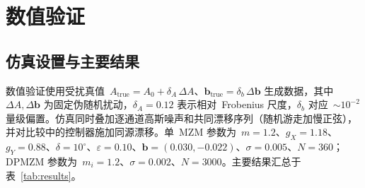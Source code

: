 \documentclass[11pt,journal,onecolumn]{IEEEtran}
\theoremstyle{plain}
\theoremstyle{remark}
\newcommand{\bv}{\mathbf{b}}
\begin{document}
\section{数值验证}
\label{sec:numerics}

\subsection{仿真设置与主要结果}
数值验证使用受扰真值~$A_{\mathrm{true}}=A_0+\delta_A\,\Delta A$、$\bv_{\mathrm{true}}=\delta_b\,\Delta\bv$ 生成数据，其中~$\Delta A,\Delta\bv$ 为固定伪随机扰动，$\delta_A{=}0.12$ 表示相对~Frobenius 尺度，$\delta_b$ 对应~${\sim}10^{-2}$ 量级偏置。仿真同时叠加逐通道高斯噪声和共同漂移序列（随机游走加慢正弦），并对比较中的控制器施加同源漂移。单~MZM 参数为~$m{=}1.2$、$g_X{=}1.18$、$g_Y{=}0.88$、$\delta{=}10^\circ$、$\varepsilon{=}0.10$、$\bv=(0.030,-0.022)$、$\sigma{=}0.005$、$N{=}360$；DPMZM 参数为~$m_i{=}1.2$、$\sigma{=}0.002$、$N{=}3000$。主要结果汇总于表~\ref{tab:results}。
\end{document}
